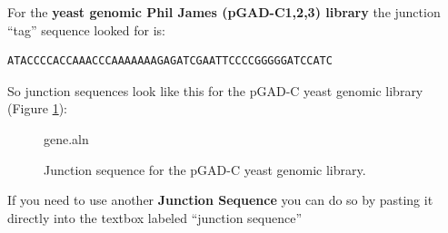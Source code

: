 \documentclass[11pt,fleqn]{book} %
\begin{document}
\vspace{15pt}

For the \textbf{yeast genomic Phil James (pGAD-C1,2,3) library} the junction ``tag'' sequence looked for is:
\begin{lstlisting}
ATACCCCACCAAACCCAAAAAAAGAGATCGAATTCCCCGGGGGATCCATC
\end{lstlisting}

So junction sequences look like this for the pGAD-C yeast genomic library (Figure \ref{fig:gene-junction}):

\begin{figure}[!ht]
\centering
\begin{texshade}{gene.aln}
%	
	\hideconsensus
	\hidenumbering
%	
%	
%	
\end{texshade}
\caption{Junction sequence for the pGAD-C yeast genomic library.}
\label{fig:gene-junction}
\end{figure}


If you need to use another \textbf{Junction Sequence} you can do so by pasting it directly into the textbox labeled ``junction sequence''
\end{document}
